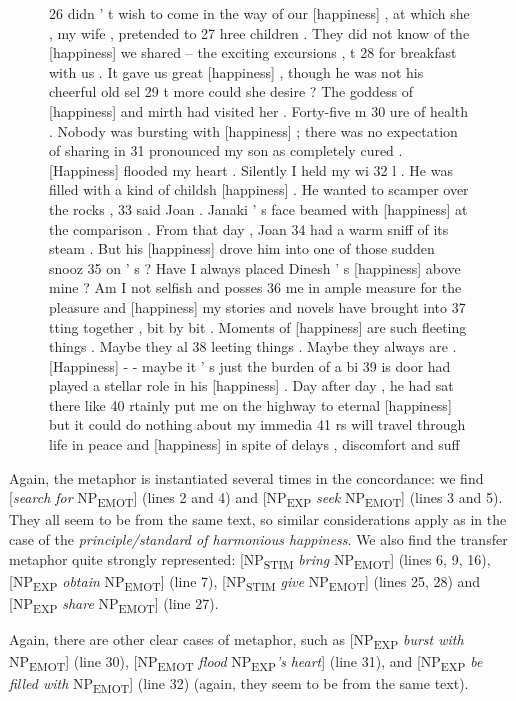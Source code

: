 \begin{figure}
\begin{fitverb}
26  didn ' t wish to come in the way of our [happiness] , at which she , my wife , pretended to
27 hree children . They did not know of the [happiness] we shared -- the exciting excursions , t
28 for breakfast with us . It gave us great [happiness] , though he was not his cheerful old sel
29 t more could she desire ? The goddess of [happiness] and mirth had visited her . Forty-five m
30 ure of health . Nobody was bursting with [happiness] ; there was no expectation of sharing in
31  pronounced my son as completely cured . [Happiness] flooded my heart . Silently I held my wi
32 l . He was filled with a kind of childsh [happiness] . He wanted to scamper over the rocks ,
33  said Joan . Janaki ' s face beamed with [happiness] at the comparison . From that day , Joan
34  had a warm sniff of its steam . But his [happiness] drove him into one of those sudden snooz
35 on ' s ? Have I always placed Dinesh ' s [happiness] above mine ? Am I not selfish and posses
36 me in ample measure for the pleasure and [happiness] my stories and novels have brought into
37 tting together , bit by bit . Moments of [happiness] are such fleeting things . Maybe they al
38 leeting things . Maybe they always are . [Happiness] - - maybe it ' s just the burden of a bi
39 is door had played a stellar role in his [happiness] . Day after day , he had sat there like
40 rtainly put me on the highway to eternal [happiness] but it could do nothing about my immedia
41 rs will travel through life in peace and [happiness] in spite of delays , discomfort and suff
\end{fitverb}
\hrulefill
\end{figure}

Again, the  metaphor  is instantiated several times in the concordance:  we find [\textit{search for} NP\textsubscript{EMOT}] (lines 2 and 4) and [NP\textsubscript{EXP} \textit{seek} NP\textsubscript{EMOT}] (lines 3 and 5). They all seem to be from the same text, so similar considerations apply as in the case of the \textit{principle\slash standard of harmonious happiness}.  We also find the transfer metaphor quite strongly represented: [NP\textsubscript{STIM} \textit{bring} NP\textsubscript{EMOT}] (lines 6, 9, 16), [NP\textsubscript{EXP} \textit{obtain} NP\textsubscript{EMOT}] (line 7), [NP\textsubscript{STIM} \textit{give} NP\textsubscript{EMOT}] (lines 25, 28) and [NP\textsubscript{EXP} \textit{share} NP\textsubscript{EMOT}] (line 27).

Again, there are other clear cases of metaphor,  such as [NP\textsubscript{EXP} \textit{burst with} NP\textsubscript{EMOT}] (line 30), [NP\textsubscript{EMOT} \textit{flood} NP\textsubscript{EXP}\textit{'s} \textit{heart}] (line 31), and [NP\textsubscript{EXP} \textit{be filled with} NP\textsubscript{EMOT}] (line 32) (again, they seem to be from the same text).

